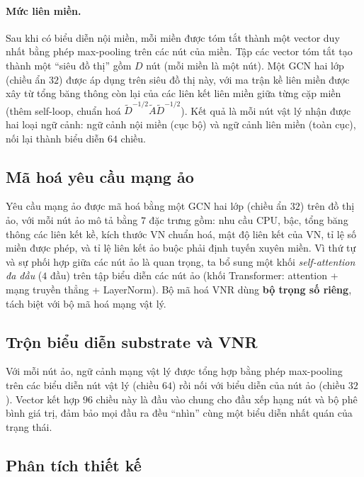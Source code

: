 \documentclass[../DoAn.tex]{subfiles}
\begin{document}
\paragraph{Mức liên miền.} Sau khi có biểu diễn nội miền, mỗi miền được tóm tắt thành một vector duy nhất bằng phép max-pooling trên các nút của miền. Tập các vector tóm tắt tạo thành một ``siêu đồ thị'' gồm $D$ nút (mỗi miền là một nút). Một GCN hai lớp (chiều ẩn $32$) được áp dụng trên siêu đồ thị này, với ma trận kề liên miền được xây từ tổng băng thông còn lại của các liên kết liên miền giữa từng cặp miền (thêm self-loop, chuẩn hoá $\tilde{D}^{-1/2}\tilde{A}\tilde{D}^{-1/2}$). Kết quả là mỗi nút vật lý nhận được hai loại ngữ cảnh: ngữ cảnh nội miền (cục bộ) và ngữ cảnh liên miền (toàn cục), nối lại thành biểu diễn $64$ chiều.

\subsection{Mã hoá yêu cầu mạng ảo}
\label{subsec:enc-vnr}

Yêu cầu mạng ảo được mã hoá bằng một GCN hai lớp (chiều ẩn $32$) trên đồ thị ảo, với mỗi nút ảo mô tả bằng $7$ đặc trưng gồm: nhu cầu CPU, bậc, tổng băng thông các liên kết kề, kích thước VN chuẩn hoá, mật độ liên kết của VN, tỉ lệ số miền được phép, và tỉ lệ liên kết ảo buộc phải định tuyến xuyên miền. Vì thứ tự và sự phối hợp giữa các nút ảo là quan trọng, ta bổ sung một khối \textit{self-attention đa đầu} ($4$ đầu) trên tập biểu diễn các nút ảo (khối Transformer: attention + mạng truyền thẳng + LayerNorm). Bộ mã hoá VNR dùng \textbf{bộ trọng số riêng}, tách biệt với bộ mã hoá mạng vật lý.

\subsection{Trộn biểu diễn substrate và VNR}
\label{subsec:enc-fusion}

Với mỗi nút ảo, ngữ cảnh mạng vật lý được tổng hợp bằng phép max-pooling trên các biểu diễn nút vật lý (chiều $64$) rồi nối với biểu diễn của nút ảo (chiều $32$). Vector kết hợp $96$ chiều này là đầu vào chung cho đầu xếp hạng nút và bộ phê bình giá trị, đảm bảo mọi đầu ra đều ``nhìn'' cùng một biểu diễn nhất quán của trạng thái.

\subsection{Phân tích thiết kế}
\label{subsec:enc-analysis}
\end{document}
